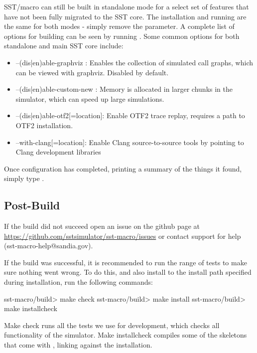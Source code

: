 SST/macro can still be built in standalone mode for a select set of features that have not been fully migrated to the SST core.  
The installation and running are the same for both modes - simply remove the  parameter.  
A complete list of options for building can be seen by running .   Some common options for both standalone and main SST core include:

\begin{itemize}
\item --(dis|en)able-graphviz : Enables the collection of simulated call graphs, which can be viewed with graphviz.
Disabled by default.
\item --(dis|en)able-custom-new : Memory is allocated in larger chunks in the simulator, which can speed up large simulations.
\item --(dis|en)able-otf2[=location]: Enable OTF2 trace replay, requires a path to OTF2 installation.
\item --with-clang[=location]: Enable Clang source-to-source tools by pointing to Clang development libraries
\end{itemize}

Once configuration has completed, printing a summary of the things it found, simply type .  

\subsection{Post-Build}
\label{subsec:postbuild}

If the build did not succeed open an issue on the github page at \url{https://github.com/sstsimulator/sst-macro/issues} or contact \sstmacro support for help (sst-macro-help@sandia.gov).

If the build was successful, it is recommended to run the range of tests to make sure nothing went wrong.  
To do this, and also install \sstmacro  to the install path specified during installation, run the following commands:

\begin{ShellCmd}
sst-macro/build> make check
sst-macro/build> make install
sst-macro/build> make installcheck
\end{ShellCmd}
Make check runs all the tests we use for development, which checks all functionality of the simulator.  
Make installcheck compiles some of the skeletons that come with \sstmacro, linking against the installation.  

